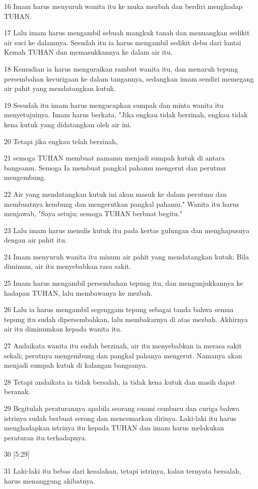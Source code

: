 \par 16 Imam harus menyuruh wanita itu ke muka mezbah dan berdiri menghadap TUHAN.
\par 17 Lalu imam harus mengambil sebuah mangkuk tanah dan menuangkan sedikit air suci ke dalamnya. Sesudah itu ia harus mengambil sedikit debu dari lantai Kemah TUHAN dan memasukkannya ke dalam air itu.
\par 18 Kemudian ia harus menguraikan rambut wanita itu, dan menaruh tepung persembahan kecurigaan ke dalam tangannya, sedangkan imam sendiri memegang air pahit yang mendatangkan kutuk.
\par 19 Sesudah itu imam harus mengucapkan sumpah dan minta wanita itu menyetujuinya. Imam harus berkata, "Jika engkau tidak berzinah, engkau tidak kena kutuk yang didatangkan oleh air ini.
\par 20 Tetapi jika engkau telah berzinah,
\par 21 semoga TUHAN membuat namamu menjadi sumpah kutuk di antara bangsamu. Semoga Ia membuat pangkal pahamu mengerut dan perutmu mengembung.
\par 22 Air yang mendatangkan kutuk ini akan masuk ke dalam perutmu dan membuatnya kembung dan mengerutkan pangkal pahamu." Wanita itu harus menjawab, "Saya setuju; semoga TUHAN berbuat begitu."
\par 23 Lalu imam harus menulis kutuk itu pada kertas gulungan dan menghapusnya dengan air pahit itu.
\par 24 Imam menyuruh wanita itu minum air pahit yang mendatangkan kutuk. Bila diminum, air itu menyebabkan rasa sakit.
\par 25 Imam harus mengambil persembahan tepung itu, dan mengunjukkannya ke hadapan TUHAN, lalu membawanya ke mezbah.
\par 26 Lalu ia harus mengambil segenggam tepung sebagai tanda bahwa semua tepung itu sudah dipersembahkan, lalu membakarnya di atas mezbah. Akhirnya air itu diminumkan kepada wanita itu.
\par 27 Andaikata wanita itu sudah berzinah, air itu menyebabkan ia merasa sakit sekali; perutnya mengembung dan pangkal pahanya mengerut. Namanya akan menjadi sumpah kutuk di kalangan bangsanya.
\par 28 Tetapi andaikata ia tidak bersalah, ia tidak kena kutuk dan masih dapat beranak.
\par 29 Begitulah peraturannya apabila seorang suami cemburu dan curiga bahwa istrinya sudah berbuat serong dan mencemarkan dirinya. Laki-laki itu harus menghadapkan istrinya itu kepada TUHAN dan imam harus melakukan peraturan itu terhadapnya.
\par 30 [5:29]
\par 31 Laki-laki itu bebas dari kesalahan, tetapi istrinya, kalau ternyata bersalah, harus menanggung akibatnya.

